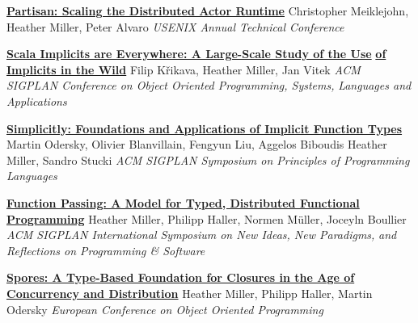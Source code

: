 \documentclass[9pt]{article}
\begin{document}


\noindent\href{https://www.usenix.org/system/files/atc19-meiklejohn.pdf}{\bf Partisan: Scaling the Distributed Actor Runtime}
\newline\noindent Christopher Meiklejohn, Heather Miller, Peter Alvaro
\newline\noindent\emph{USENIX Annual Technical Conference}
\bigskip

\noindent\href{https://arxiv.org/pdf/1908.07883}{\bf Scala Implicits are Everywhere: A Large-Scale Study of the Use}
\newline\noindent\href{https://arxiv.org/pdf/1908.07883}{\bf of Implicits in the Wild}
\newline\noindent Filip K\v{r}ikava, Heather Miller, Jan Vitek
\newline\noindent\emph{ACM SIGPLAN Conference on Object Oriented Programming, Systems,}
\newline\noindent\emph{Languages and Applications}
\bigskip

\noindent\href{https://infoscience.epfl.ch/record/229878}{\bf Simplicitly: Foundations and Applications of Implicit Function Types}
\newline\noindent Martin Odersky, Olivier Blanvillain, Fengyun Liu, Aggelos Biboudis
\newline\noindent Heather Miller, Sandro Stucki
\newline\noindent\emph{ACM SIGPLAN Symposium on Principles of Programming Languages}
\bigskip

\noindent\href{https://infoscience.epfl.ch/record/205822}{\bf Function Passing: A Model for Typed, Distributed Functional}\vspace{-0.03in}
\newline\noindent\href{https://infoscience.epfl.ch/record/205822}{\bf Programming}
\newline\noindent Heather Miller, Philipp Haller, Normen M\"{u}ller, Joceyln Boullier
\newline\noindent\emph{ACM SIGPLAN International Symposium on New Ideas, New Paradigms,}
\newline\noindent\emph{and Reflections on Programming \& Software}
\bigskip

\noindent\href{http://infoscience.epfl.ch/record/191239}{\bf Spores: A Type-Based Foundation for Closures in the Age of}\vspace{-0.03in}
\newline\noindent\href{http://infoscience.epfl.ch/record/191239}{\bf Concurrency and Distribution}
\newline\noindent Heather Miller, Philipp Haller, Martin Odersky
\newline\noindent\emph{European Conference on Object Oriented Programming}
\bigskip
\end{document}
